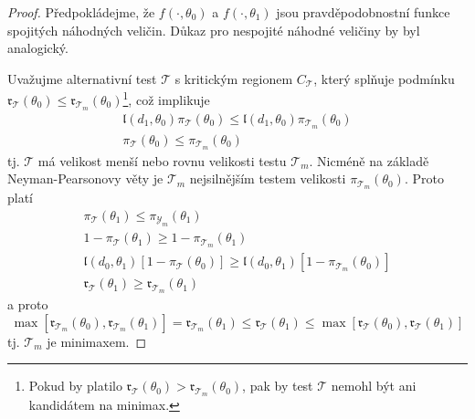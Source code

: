\begin{proof}
Předpokládejme, že $f(\cdot, \theta_0)$ a $f(\cdot, \theta_1)$ jsou pravděpodobnostní funkce spojitých náhodných veličin. Důkaz pro nespojité náhodné veličiny by byl analogický.

Uvažujme alternativní test $\mathscr{T}$ s kritickým regionem $C_{\mathscr{T}}$, který splňuje podmínku $\mathfrak{r}_{\mathscr{T}}(\theta_0) \le \mathfrak{r}_{\mathscr{T}_m}(\theta_0)$\footnote{Pokud by platilo $\mathfrak{r}_{\mathscr{T}}(\theta_0) > \mathfrak{r}_{\mathscr{T}_m}(\theta_0)$, pak by test $\mathscr{T}$ nemohl být ani kandidátem na minimax.}, což implikuje
\begin{gather*}
\mathfrak{l}(d_1, \theta_0)\pi_{\mathscr{T}}(\theta_0) \le \mathfrak{l}(d_1, \theta_0)\pi_{\mathscr{T}_m}(\theta_0)\\
\pi_{\mathscr{T}}(\theta_0) \le \pi_{\mathscr{T}_m}(\theta_0)
\end{gather*}
tj. $\mathscr{T}$ má velikost menší nebo rovnu velikosti testu $\mathscr{T}_m$. Nicméně na základě Neyman-Pearsonovy věty je $\mathscr{T}_m$ nejsilnějším testem velikosti $\pi_{\mathscr{T}_m}(\theta_0)$. Proto platí
\begin{gather*}
\pi_{\mathscr{T}}(\theta_1) \le \pi_{\mathscr{Y}_m}(\theta_1)\\
1 - \pi_{\mathscr{T}}(\theta_1) \ge 1 - \pi_{\mathscr{T}_m}(\theta_1)\\
\mathfrak{l}(d_0, \theta_1)[1 - \pi_{\mathscr{T}}(\theta_0)] \ge \mathfrak{l}(d_0, \theta_1)[1 - \pi_{\mathscr{T}_m}(\theta_0)]\\
\mathfrak{r}_{\mathscr{T}}(\theta_1) \ge \mathfrak{r}_{\mathscr{T}_m}(\theta_1)
\end{gather*}
a proto
\begin{equation*}
\max[\mathfrak{r}_{\mathscr{T}_m}(\theta_0), \mathfrak{r}_{\mathscr{T}_m}(\theta_1)] = \mathfrak{r}_{\mathscr{T}_m}(\theta_1) \le \mathfrak{r}_{\mathscr{T}}(\theta_1) \le \max[\mathfrak{r}_{\mathscr{T}}(\theta_0), \mathfrak{r}_{\mathscr{T}}(\theta_1)]
\end{equation*}
tj. $\mathscr{T}_m$ je minimaxem.
\end{proof}

